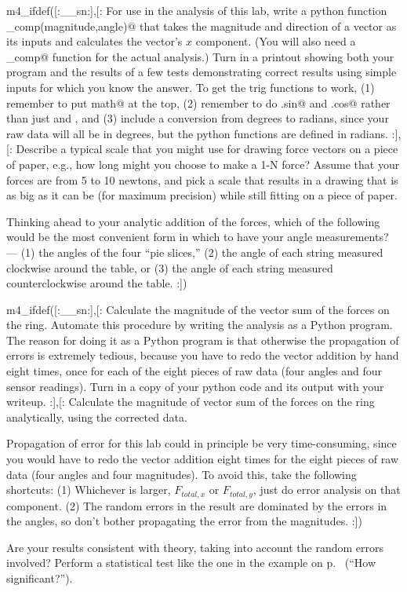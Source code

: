 \prelab

m4_ifdef([:__sn:],[:%
\prelabquestion For use in the analysis of this lab, write a python function \verb@x_comp(magnitude,angle)@ that
takes the magnitude and direction of a vector as its inputs and calculates the vector's $x$ component.
(You will also need a \verb@y_comp@ function for the actual analysis.)
Turn in a printout showing both your program and the results of a few tests demonstrating correct results
using simple inputs for which you know the answer.
To get the trig functions to work, (1) remember to put \verb@import math@ at the top, (2) remember to do \verb@math.sin@
and \verb@math.cos@ rather than just \verb@sin@ and \verb@cos@, and (3) include a conversion from degrees to radians, since
your raw data will all be in degrees, but the python functions are defined in radians.
:],[:%
\prelabquestion  Describe a typical scale that you might use for drawing
force vectors on a piece of paper, e.g., how long might you
choose to make a 1-N force?  Assume that your forces are
from 5 to 10 newtons, and pick a scale that results in a drawing that
is as big as it can be (for maximum precision) while still fitting on
a piece of paper.

\prelabquestion Thinking ahead to your analytic addition of the forces,
which of the following would be the most convenient form in which to have
your angle measurements? --- (1) the angles of the four ``pie slices,''
(2) the angle of each string measured clockwise around the table,
or (3) the angle of each string measured counterclockwise around the table.
:])

\analysis

m4_ifdef([:__sn:],[:%
Calculate the magnitude of the vector sum of the forces on the
ring. Automate this procedure by writing the analysis as a Python program.
The reason for doing it as a Python program is that otherwise the propagation of errors
is extremely tedious, because you have to redo the vector addition by hand eight times,
once for each of the eight pieces of raw data (four angles and four sensor readings).
Turn in a copy of your python code and its output with your writeup. 
:],[:%
Calculate the magnitude of vector sum of the forces on the
ring analytically, using the corrected data.

Propagation of error for this lab could in principle be very time-consuming,
since you would have to redo the vector addition eight times for the eight
pieces of raw data (four angles and four magnitudes). 
To avoid this, take the following shortcuts: (1) Whichever is larger,
$F_{total,x}$ or $F_{total,y}$, just do error analysis on that component.
(2) The random errors in the result are dominated by the errors in the angles,
so don't bother propagating the error from the magnitudes.
:])

Are your results consistent with theory, taking into account
the random errors involved? Perform a statistical test like the
one in the example on p.~\pageref{eg:fine-structure} (``How significant?'').
